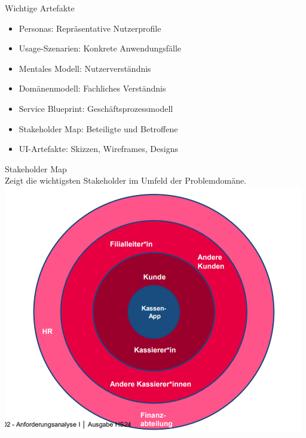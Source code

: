\begin{corollary}{Wichtige Artefakte}
\begin{itemize}
    \item Personas: Repräsentative Nutzerprofile
    \item Usage-Szenarien: Konkrete Anwendungsfälle
    \item Mentales Modell: Nutzerverständnis
    \item Domänenmodell: Fachliches Verständnis
    \item Service Blueprint: Geschäftsprozessmodell
    \item Stakeholder Map: Beteiligte und Betroffene
    \item UI-Artefakte: Skizzen, Wireframes, Designs
\end{itemize}
\end{corollary}

\begin{example2}{Stakeholder Map}\\
Zeigt die wichtigsten Stakeholder im Umfeld der Problemdomäne.\\
\includegraphics[width=0.8\linewidth]{images/stakeholdermap.png}
\end{example2}



